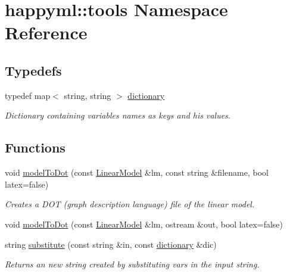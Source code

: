 \hypertarget{namespacehappyml_1_1tools}{}\section{happyml\+:\+:tools Namespace Reference}
\label{namespacehappyml_1_1tools}
\subsection*{Typedefs}
\begin{DoxyCompactItemize}
\item 
typedef map$<$ string, string $>$ \hyperlink{namespacehappyml_1_1tools_a2c4240e249e861d6bee0eb8a0a075906}{dictionary}
\begin{DoxyCompactList}\small\item\em Dictionary containing variables names as keys and his values. \end{DoxyCompactList}\end{DoxyCompactItemize}
\subsection*{Functions}
\begin{DoxyCompactItemize}
\item 
void \hyperlink{namespacehappyml_1_1tools_a6f47230aae3306f22138234d005581fd}{model\+To\+Dot} (const \hyperlink{classhappyml_1_1LinearModel}{Linear\+Model} \&lm, const string \&filename, bool latex=false)
\begin{DoxyCompactList}\small\item\em Creates a D\+OT (graph description language) file of the linear model. \end{DoxyCompactList}\item 
void \hyperlink{namespacehappyml_1_1tools_a9dcbcf45a1a9114d45e12252fd2b0f8a}{model\+To\+Dot} (const \hyperlink{classhappyml_1_1LinearModel}{Linear\+Model} \&lm, ostream \&out, bool latex=false)
\item 
string \hyperlink{namespacehappyml_1_1tools_a4b070b3500ff510ca3e80bafa1bb5a18}{substitute} (const string \&in, const \hyperlink{namespacehappyml_1_1tools_a2c4240e249e861d6bee0eb8a0a075906}{dictionary} \&dic)
\begin{DoxyCompactList}\small\item\em Returns an new string created by substituting vars in the input string. \end{DoxyCompactList}\end{DoxyCompactItemize}
